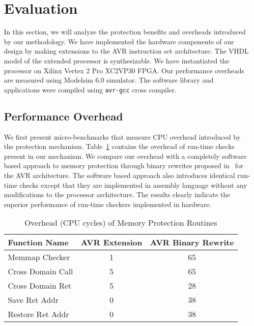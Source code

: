 \section{Evaluation}
\label{sec:eval}
In this section, we will analyze the protection benefits and overheads introduced by our methodology.
%
We have implemented the hardware components of our design by making extensions to the AVR instruction set architecture.
%
The VHDL model of the extended processor is synthesizable.
%
We have instantiated the processor on Xilinx Vertex 2 Pro XC2VP30 FPGA.
%
Our performance overheads are measured using Modelsim 6.0 simulator.
%
The software library and applications were compiled using \texttt{avr-gcc} cross compiler.
%
%
\subsection{Performance Overhead}
%
We first present micro-benchmarks that measure CPU overhead introduced by the protection mechanism.
%
Table~\ref{tab:microbmperf} contains the overhead of run-time checks present in our mechanism.
%
We compare our overhead with a completely software based approach to memory protection through binary rewrites proposed in~\cite{ram07harbor} for the AVR architecture.
%
The software based approach also introduces identical run-time checks except that they are implemented in assembly language without any modifications to the processor architecture.
%
The results clearly indicate the superior performance of run-time checkers implemented in hardware.
%
\begin{table}[htdp]
\centering
\small{
\begin{tabular}{|l|c|c|}
	\hline
	Function Name & AVR Extension & AVR Binary Rewrite\\
	\hline
	Memmap Checker & 1 & 65\\
	Cross Domain Call & 5 & 65\\
	Cross Domain Ret & 5 & 28\\
	Save Ret Addr & 0 & 38\\
	Restore Ret Addr & 0 & 38\\
	\hline
\end{tabular}}
\caption{Overhead (CPU cycles) of Memory Protection Routines}
\label{tab:microbmperf}
\end{table}
%

